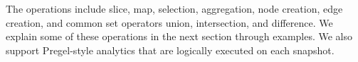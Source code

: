The \tga operations include slice, map, selection, aggregation, node
creation, edge creation, and common set operators union, intersection,
and difference.  We explain some of these operations in the next
section through examples.  We also support Pregel-style analytics that
are logically executed on each snapshot.

